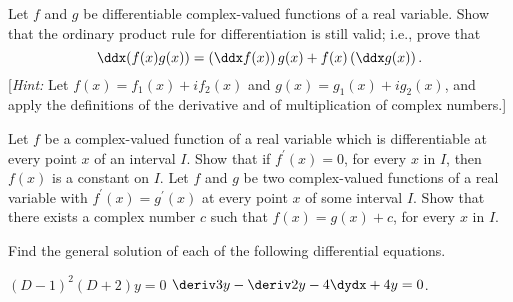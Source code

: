 \begin{exercises}
Let $f$ and $g$ be differentiable complex-valued
functions of a real variable.
Show that the ordinary product rule for
differentiation is still valid; i.e., prove that
\[
\ddx (f(x)g(x)) =
\left(\ddx f(x)\right)g(x) +
f(x)\left(\ddx g(x)\right)
.
\]
[\emph{Hint:} Let $f(x) = f_1(x)+if_2(x)$
and $g(x) = g_1(x) + ig_2(x)$, and apply
the definitions of the derivative and of multiplication
of complex numbers.]

\begin{exenum}
\x
Let $f$ be a complex-valued function of a real variable
which is differentiable at every point $x$ of an
interval $I$.
Show that if $f^\prime(x)=0$, for every $x$ in $I$,
then $f(x)$ is a constant on $I$.
\x
Let $f$ and $g$ be two complex-valued functions
of a real variable with $f^\prime(x)=g^\prime(x)$
at every point $x$ of some interval $I$.
Show that there exists a complex number $c$
such that $f(x)=g(x)+c$, for every $x$ in $I$.
\end{exenum}

Find the general solution of each of the following
differential equations.
\begin{exenum}
\x
$(D-1)^2(D+2)y=0$
\x
$\deriv3y-\deriv2y-4\dydx +4y = 0$.
\end{exenum}

\end{exercises}
